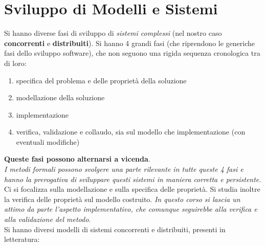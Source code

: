 \documentclass[a4paper,12pt, oneside]{book}
\begin{document}
\chapter{Sviluppo di Modelli e Sistemi}
Si hanno diverse fasi di sviluppo di \textit{sistemi complessi} (nel nostro caso
\textbf{concorrenti} e \textbf{distribuiti}). Si hanno 4 grandi fasi (che
riprendono le generiche fasi dello sviluppo software), che non
seguono una rigida sequenza cronologica tra di loro:
\begin{enumerate}
  \item specifica del problema e delle proprietà della soluzione
  \item modellazione della soluzione
  \item implementazione
  \item verifica, validazione e collaudo, sia sul modello che
  implementazione (con eventuali modifiche)
\end{enumerate}
\textbf{Queste fasi possono alternarsi a vicenda}.\\
\textit{I metodi formali possono svolgere una parte rilevante in tutte queste 4
  fasi e hanno la prerogativa di sviluppare questi sistemi in maniera corretta e
  persistente.} \\
Ci si focalizza sulla modellazione e sulla specifica delle proprietà. Si studia
inoltre la verifica delle proprietà sul modello costruito. \textit{In questo
  corso si lascia un attimo da parte l'aspetto implementativo, che comunque
  seguirebbe alla verifica e alla validazione del metodo}.\\
Si hanno diversi modelli di sistemi concorrenti e distribuiti, presenti in
letteratura: 
\end{document}
